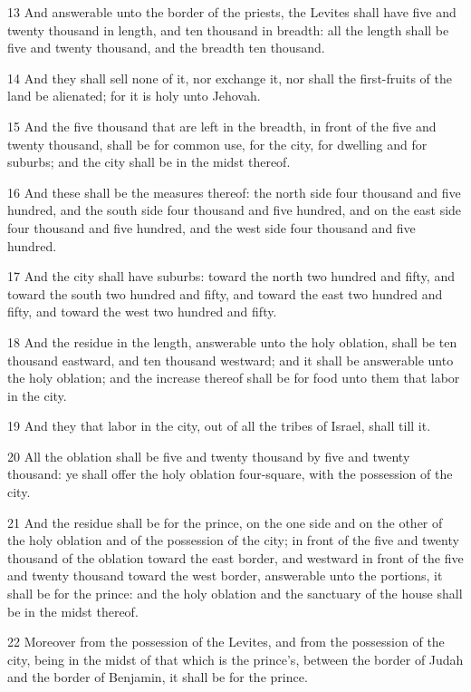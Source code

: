 \par 13 And answerable unto the border of the priests, the Levites shall have five and twenty thousand in length, and ten thousand in breadth: all the length shall be five and twenty thousand, and the breadth ten thousand.
\par 14 And they shall sell none of it, nor exchange it, nor shall the first-fruits of the land be alienated; for it is holy unto Jehovah.
\par 15 And the five thousand that are left in the breadth, in front of the five and twenty thousand, shall be for common use, for the city, for dwelling and for suburbs; and the city shall be in the midst thereof.
\par 16 And these shall be the measures thereof: the north side four thousand and five hundred, and the south side four thousand and five hundred, and on the east side four thousand and five hundred, and the west side four thousand and five hundred.
\par 17 And the city shall have suburbs: toward the north two hundred and fifty, and toward the south two hundred and fifty, and toward the east two hundred and fifty, and toward the west two hundred and fifty.
\par 18 And the residue in the length, answerable unto the holy oblation, shall be ten thousand eastward, and ten thousand westward; and it shall be answerable unto the holy oblation; and the increase thereof shall be for food unto them that labor in the city.
\par 19 And they that labor in the city, out of all the tribes of Israel, shall till it.
\par 20 All the oblation shall be five and twenty thousand by five and twenty thousand: ye shall offer the holy oblation four-square, with the possession of the city.
\par 21 And the residue shall be for the prince, on the one side and on the other of the holy oblation and of the possession of the city; in front of the five and twenty thousand of the oblation toward the east border, and westward in front of the five and twenty thousand toward the west border, answerable unto the portions, it shall be for the prince: and the holy oblation and the sanctuary of the house shall be in the midst thereof.
\par 22 Moreover from the possession of the Levites, and from the possession of the city, being in the midst of that which is the prince's, between the border of Judah and the border of Benjamin, it shall be for the prince.
